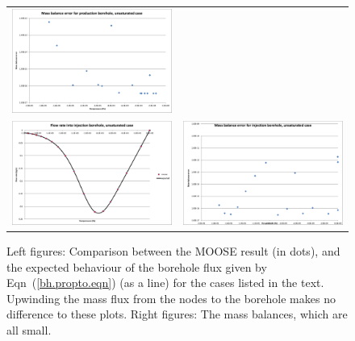 \documentclass[]{scrreprt}
\begin{document}
\begin{figure}[htb]
\begin{tabular}{cc}
\includegraphics[width=7cm]{bh04_mass_balance.eps} \\
\includegraphics[width=7cm]{bh05.eps} &
\includegraphics[width=7cm]{bh05_mass_balance.eps}
\end{tabular}
\caption{Left figures: Comparison between the MOOSE result (in dots), and the
  expected behaviour of the borehole flux given by
  Eqn~(\ref{bh.propto.eqn}) (as a line) for the cases listed in the
  text.  Upwinding the mass flux from the nodes to the borehole makes
  no difference to these plots.  Right
  figures: The mass balances, which are all small.}
\label{bh02_05.fig}
\end{figure}
\end{document}
